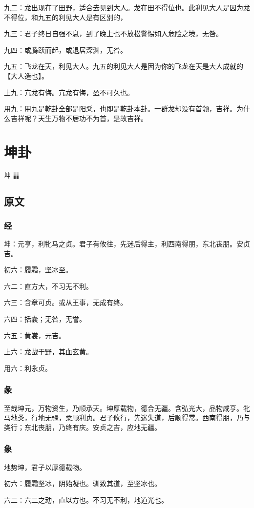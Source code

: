 \documentclass[12pt,oneside]{book}
\begin{document}
九二：龙出现在了田野，适合去见到大人。龙在田不得位也。此利见大人是因为龙不得位，和九五的利见大人是有区别的，

九三：君子终日自强不息，到了晚上也不放松警惕如入危险之境，无咎。

九四：或腾跃而起，或退居深渊，无咎。

九五：飞龙在天，利见大人。九五的利见大人是因为你的飞龙在天是大人成就的【大人造也】。

上九：亢龙有悔。亢龙有悔，盈不可久也。

用九：用九是乾卦全部是阳爻，也即是乾卦本卦。一群龙却没有首领，吉祥。为什么吉祥呢？天生万物不居功不为首，是故吉祥。


\chapter{坤卦}
坤 {\Large ䷁}

\section{原文}
\subsection{经}
坤：元亨，利牝马之贞。君子有攸往，先迷后得主，利西南得朋，东北丧朋。安贞吉。

初六：履霜，坚冰至。

六二：直方大，不习无不利。

六三：含章可贞。或从王事，无成有终。

六四：括囊；无咎，无誉。

六五：黄裳，元吉。

上六：龙战于野，其血玄黄。

用六：利永贞。

\subsection{彖}
至哉坤元，万物资生，乃顺承天。坤厚载物，德合无疆。含弘光大，品物咸亨。牝马地类，行地无疆，柔顺利贞。君子攸行，先迷失道，后顺得常。西南得朋，乃与类行；东北丧朋，乃终有庆。安贞之吉，应地无疆。

\subsection{象}
地势坤，君子以厚德载物。

初六：履霜坚冰，阴始凝也。驯致其道，至坚冰也。

六二：六二之动，直以方也。不习无不利，地道光也。
\end{document}
